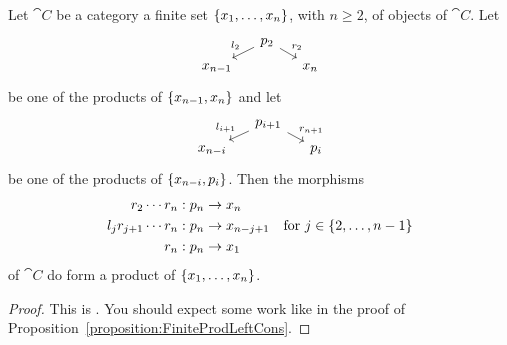 \begin{proposition}\label{proposition:FiniteProdRightCons}
  Let \(\cat C\) be a category a finite set
  \(\left\{x_1, \dots{}, x_n\right\}\), with \(n \ge 2\), of objects of
  \(\cat C\). Let
  \[\begin{tikzcd}[row sep=tiny, column sep=small]
      & p_2 \ar["{l_2}", dl, swap] \ar["{r_2}", dr] \\
      x_{n-1} & & x_n
    \end{tikzcd}\] be one of the products of \(\left\{x_{n-1}, x_n\right\}\)
  and let
  \[\begin{tikzcd}[row sep=tiny, column sep=small]
      & p_{i+1} \ar["{l_{i+1}}", dl, swap] \ar["{r_{n+1}}", dr] \\
      x_{n-i} & & p_i
    \end{tikzcd}\] be one of the products of \(\left\{x_{n-i}, p_i\right\}\).
%
%
  Then the morphisms
  \[\begin{aligned}
    r_2 \cdots{} r_n &: p_n \to x_n \\
    l_j r_{j+1} \cdots{} r_n &: p_n \to x_{n-j+1} \quad \text{for } j \in \left\{2, \dots{}, n-1\right\} \\
    r_n &: p_n \to x_1
  \end{aligned}\]
of \(\cat C\) do form a product of \(\left\{x_1, \dots{}, x_n\right\}\).
\end{proposition}

\begin{proof}
  This is . You should expect some work like in
  the proof of Proposition~\ref{proposition:FiniteProdLeftCons}.
\end{proof}

